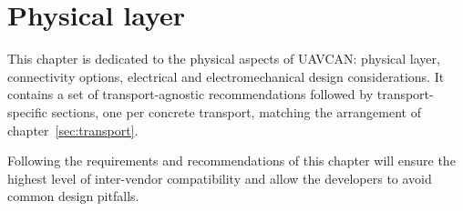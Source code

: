 \chapter{Physical layer}\label{sec:physical}

This chapter is dedicated to the physical aspects of UAVCAN:
physical layer, connectivity options, electrical and electromechanical design considerations.
It contains a set of transport-agnostic recommendations followed by transport-specific sections,
one per concrete transport, matching the arrangement of chapter~\ref{sec:transport}.

Following the requirements and recommendations of this chapter will ensure the highest level of
inter-vendor compatibility and allow the developers to avoid common design pitfalls.

\clearpage
\clearpage
